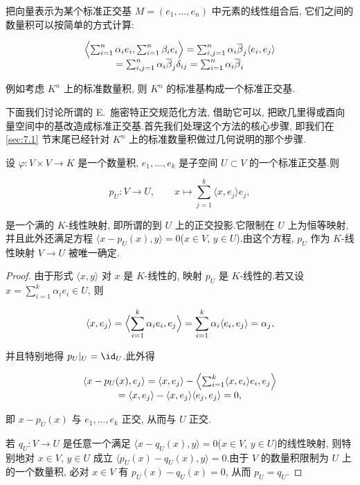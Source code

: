把向量表示为某个标准正交基 $M = (e_1, \ldots, e_n)$ 中元素的线性组合后, 它们之间的数量积可以按简单的方式计算:

\[
\begin{array}{c}
\Bigl\langle \sum_{i = 1}^{n} \alpha_i e_i, \sum_{i = 1}^{n} \beta_i e_i \Bigr\rangle = \sum_{i, j = 1}^{n} \alpha_i \overline{\beta}_j \langle e_i, e_j \rangle \\
= \sum_{i, j = 1}^{n} \alpha_i \overline{\beta}_j \delta_{ij} = \sum_{i = 1}^{n} \alpha_i \overline{\beta}_i
\end{array}
\]

例如考虑 $K^n$ 上的标准数量积, 则 $K^n$ 的标准基构成一个标准正交基.

下面我们讨论所谓的 E.~施密特正交规范化方法, 借助它可以, 把欧几里得或酉向量空间中的基改造成标准正交基.首先我们处理这个方法的核心步骤, 即我们在 \ref{sec:7.1} 节末尾已经针对 $K^n$ 上的标准数量积做过几何说明的那个步骤.

\begin{lemma}\label{lem:7.2.4}
设 $\varphi \colon V \times V \longrightarrow K$ 是一个数量积, $e_1, \ldots, e_k$ 是子空间 $U \subset V$ 的一个标准正交基.则

\[
p_U \colon V \longrightarrow U, \qquad x \longmapsto \sum_{j = 1}^{k} \langle x, e_j \rangle e_j,
\]

是一个满的 $K$-线性映射, 即所谓的到 $U$ 上的正交投影.它限制在 $U$ 上为恒等映射, 并且此外还满足方程 $\langle x - p_U(x), y \rangle = 0$($x \in V$, $y \in U$).由这个方程, $p_U$ 作为 $K$-线性映射 $V \longrightarrow U$ 被唯一确定.
\end{lemma}

\begin{proof}
由于形式 $\langle x, y \rangle$ 对 $x$ 是 $K$-线性的, 映射 $p_U$ 是 $K$-线性的.若又设 $x = \sum_{i = 1}^{k} \alpha_i e_i \in U$, 则

\[
\langle x, e_j \rangle = \Bigl\langle \sum_{i = 1}^{k} \alpha_i e_i, e_j \Bigr\rangle = \sum_{i = 1}^{k} \alpha_i \langle e_i, e_j \rangle = \alpha_j,
\]

并且特别地得 $p_U|_U = \id_U$.此外得

\[
\begin{array}{c}
\langle x - p_U(x), e_j \rangle = \langle x, e_j \rangle - \Bigl\langle \sum_{i = 1}^{k} \langle x, e_i \rangle e_i, e_j \Bigr\rangle \\
= \langle x, e_j \rangle - \langle x, e_j \rangle \langle e_j, e_j \rangle = 0,
\end{array}
\]

即 $x - p_U(x)$ 与 $e_1, \ldots, e_k$ 正交, 从而与 $U$ 正交.

若 $q_U \colon V \longrightarrow U$ 是任意一个满足 $\langle x - q_U(x), y \rangle = 0$($x \in V$, $y \in U$)的线性映射, 则特别地对 $x \in V$, $y \in U$ 成立 $\langle p_U(x) - q_U(x), y \rangle = 0$.由于 $V$ 的数量积限制为 $U$ 上的一个数量积, 必对 $x \in V$ 有 $p_U(x) - q_U(x) = 0$, 从而 $p_U = q_U$.
\end{proof}

